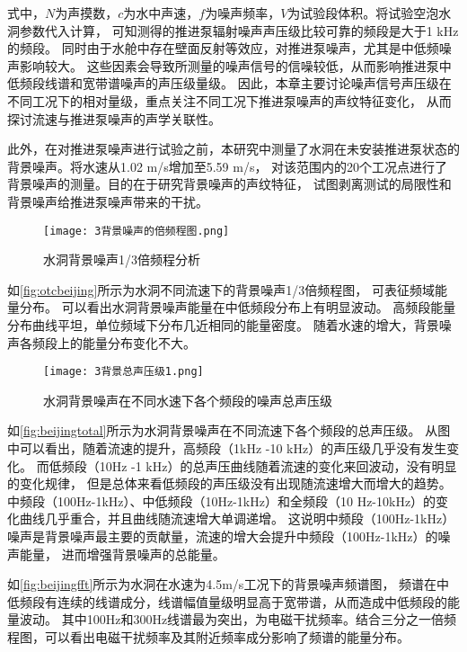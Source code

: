 式中，$N$为声摸数，$c$为水中声速，$f$为噪声频率，$V$为试验段体积。将试验空泡水洞参数代入计算，
可知测得的推进泵辐射噪声声压级比较可靠的频段是大于1 kHz的频段。
同时由于水舱中存在壁面反射等效应，对推进泵噪声，尤其是中低频噪声影响较大。
这些因素会导致所测量的噪声信号的信噪较低，从而影响推进泵中低频段线谱和宽带谱噪声的声压级量级。
因此，本章主要讨论噪声信号声压级在不同工况下的相对量级，重点关注不同工况下推进泵噪声的声纹特征变化，
从而探讨流速与推进泵噪声的声学关联性。

此外，在对推进泵噪声进行试验之前，本研究中测量了水洞在未安装推进泵状态的背景噪声。将水速从1.02 m/s增加至5.59 m/s，
对该范围内的20个工况点进行了背景噪声的测量。目的在于研究背景噪声的声纹特征，
试图剥离测试的局限性和背景噪声给推进泵噪声带来的干扰。
\begin{figure}[htbp]
    \centering
    \texttt{[image: 3背景噪声的倍频程图.png]}
    \caption{\label{fig:otcbeijing}水洞背景噪声1/3倍频程分析}
\end{figure}

如\autoref{fig:otcbeijing}所示为水洞不同流速下的背景噪声1/3倍频程图，
可表征频域能量分布。
可以看出水洞背景噪声能量在中低频段分布上有明显波动。
高频段能量分布曲线平坦，单位频域下分布几近相同的能量密度。
随着水速的增大，背景噪声各频段上的能量分布变化不大。

\begin{figure}[htbp]
    \centering
    \texttt{[image: 3背景总声压级1.png]}
    \caption{\label{fig:beijingtotal}水洞背景噪声在不同水速下各个频段的噪声总声压级}
\end{figure}

如\autoref{fig:beijingtotal}所示为水洞背景噪声在不同流速下各个频段的总声压级。
从图中可以看出，随着流速的提升，高频段（1kHz -10 kHz）的声压级几乎没有发生变化。
而低频段（10Hz -1 kHz）的总声压曲线随着流速的变化来回波动，没有明显的变化规律，
但是总体来看低频段的声压级没有出现随流速增大而增大的趋势。
中频段（100Hz-1kHz）、中低频段（10Hz-1kHz）和全频段（10 Hz-10kHz）的变化曲线几乎重合，并且曲线随流速增大单调递增。
这说明中频段（100Hz-1kHz）噪声是背景噪声最主要的贡献量，流速的增大会提升中频段（100Hz-1kHz）的噪声能量，
进而增强背景噪声的总能量。

如\autoref{fig:beijingfft}所示为水洞在水速为4.5m/s工况下的背景噪声频谱图，
频谱在中低频段有连续的线谱成分，线谱幅值量级明显高于宽带谱，从而造成中低频段的能量波动。
其中100Hz和300Hz线谱最为突出，为电磁干扰频率。结合三分之一倍频程图，可以看出电磁干扰频率及其附近频率成分影响了频谱的能量分布。

